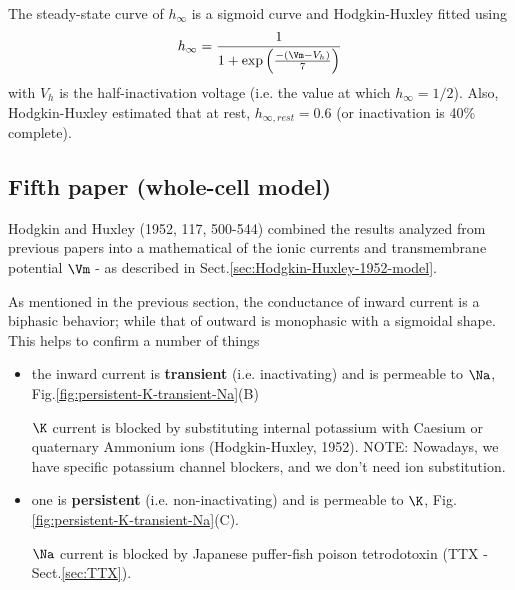 
The steady-state curve of $h_\infty$ is a sigmoid curve and Hodgkin-Huxley
fitted using 
\begin{equation}
h_\infty = \frac{1}{1 + \exp\left(  \frac{-(\Vm - V_h)}{7} \right)}
\end{equation}
with $V_h$ is the half-inactivation voltage (i.e. the value at which
$h_\infty=1/2$). Also, Hodgkin-Huxley estimated that at rest, $h_{\infty, rest}
= 0.6$ (or inactivation is 40\% complete).

\subsection{Fifth paper (whole-cell model)}



Hodgkin and Huxley (1952, 117, 500-544) combined the results analyzed from
previous papers into a mathematical of the ionic currents and transmembrane
potential $\Vm$ - as described in Sect.\ref{sec:Hodgkin-Huxley-1952-model}.

As mentioned in the previous section, the conductance of inward current is a
biphasic behavior; while that of outward is monophasic with a sigmoidal shape.
This helps to confirm a number of things
\begin{itemize}
  \item the inward current is {\bf transient} (i.e. inactivating)   and is
  permeable to $\Na$, Fig.\ref{fig:persistent-K-transient-Na}(B)

$\K$ current is blocked by substituting internal potassium with Caesium or
quaternary Ammonium ions (Hodgkin-Huxley, 1952). NOTE: Nowadays, we have
specific potassium channel blockers, and we don't need ion substitution.
  
  \item one is {\bf persistent} (i.e. non-inactivating) and is permeable to
  $\K$, Fig.\ref{fig:persistent-K-transient-Na}(C).
  
$\Na$ current is blocked by Japanese puffer-fish poison tetrodotoxin (TTX -
Sect.\ref{sec:TTX}).
\end{itemize}


